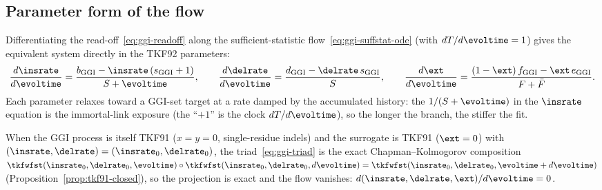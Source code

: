 \subsection{Parameter form of the flow}
\label{sec:comp-ggi-param}

Differentiating the read-off~\eqref{eq:ggi-readoff} along the sufficient-statistic
flow~\eqref{eq:ggi-suffstat-ode} (with $dT/d\evoltime=1$) gives the equivalent
system directly in the TKF92 parameters:
\begin{equation}
\label{eq:ggi-param-ode}
\frac{d\insrate}{d\evoltime}
  = \frac{b_\ggi-\insrate\,(s_\ggi+1)}{S+\evoltime},
\qquad
\frac{d\delrate}{d\evoltime}
  = \frac{d_\ggi-\delrate\,s_\ggi}{S},
\qquad
\frac{d\ext}{d\evoltime}
  = \frac{(1-\ext)\,f_\ggi-\ext\,e_\ggi}{\nfragext+\nfragend}.
\end{equation}
Each parameter relaxes toward a GGI-set target at a rate damped by the
accumulated history: the $1/(S+\evoltime)$ in the $\insrate$ equation is the
immortal-link exposure (the ``$+1$'' is the clock $dT/d\evoltime$), so the
longer the branch, the stiffer the fit.

\begin{proposition}
\label{prop:ggi-fixed-line}
When the GGI process is itself TKF91 ($x=y=0$, single-residue indels) and the
surrogate is TKF91 ($\ext=0$) with $(\insrate,\delrate)=(\insrate_0,\delrate_0)$,
the triad~\eqref{eq:ggi-triad} is the exact Chapman--Kolmogorov composition
$\tkfwfst(\insrate_0,\delrate_0,\evoltime)\circ\tkfwfst(\insrate_0,\delrate_0,d\evoltime)
=\tkfwfst(\insrate_0,\delrate_0,\evoltime+d\evoltime)$
(Proposition~\ref{prop:tkf91-closed}), so the projection is exact and the flow
vanishes: $d(\insrate,\delrate,\ext)/d\evoltime=0$.
\end{proposition}

